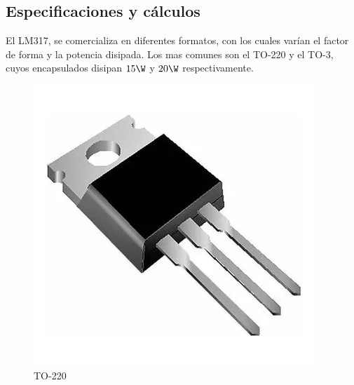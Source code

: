 \documentclass[chaptersright]{informeutn}
\begin{document}
        \subsection{Especificaciones y cálculos}
          El LM317, se comercializa en diferentes formatos, con los cuales varían el factor de forma y la potencia
          disipada. Los mas comunes son el TO-220 y el TO-3, cuyos encapsulados disipan $15\W$ y $20\W$ respectivamente.
          \begin{figure}[H]
            \centering
            \begin{minipage}[b]{0.3\textwidth}
                \centering
                \includegraphics[width=\textwidth]{pictures/to220.jpg}
                \caption*{TO-220}
            \end{minipage}
            \hspace{1cm}
            \begin{minipage}[b]{0.3\textwidth}
                \centering

\end{minipage}
\end{figure}
\end{document}
